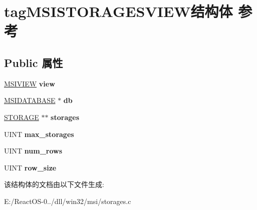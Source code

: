 \hypertarget{structtag_m_s_i_s_t_o_r_a_g_e_s_v_i_e_w}{}\section{tag\+M\+S\+I\+S\+T\+O\+R\+A\+G\+E\+S\+V\+I\+E\+W结构体 参考}
\label{structtag_m_s_i_s_t_o_r_a_g_e_s_v_i_e_w}
\subsection*{Public 属性}
\begin{DoxyCompactItemize}
\item 
\mbox{\label{structtag_m_s_i_s_t_o_r_a_g_e_s_v_i_e_w_a918a3b28d1acaf81cf32392324a6652d}} 
\hyperlink{structtag_m_s_i_v_i_e_w}{M\+S\+I\+V\+I\+EW} {\bfseries view}
\item 
\mbox{\label{structtag_m_s_i_s_t_o_r_a_g_e_s_v_i_e_w_ab618572dcfac6aac2fda5800db3171e3}} 
\hyperlink{structtag_m_s_i_d_a_t_a_b_a_s_e}{M\+S\+I\+D\+A\+T\+A\+B\+A\+SE} $\ast$ {\bfseries db}
\item 
\mbox{\label{structtag_m_s_i_s_t_o_r_a_g_e_s_v_i_e_w_ab9f5aff467745018e46313ce2a0b24fb}} 
\hyperlink{structtab_s_t_o_r_a_g_e}{S\+T\+O\+R\+A\+GE} $\ast$$\ast$ {\bfseries storages}
\item 
\mbox{\label{structtag_m_s_i_s_t_o_r_a_g_e_s_v_i_e_w_a4d7735307ba2166faa7dac33fe72e484}} 
U\+I\+NT {\bfseries max\+\_\+storages}
\item 
\mbox{\label{structtag_m_s_i_s_t_o_r_a_g_e_s_v_i_e_w_a7953d8d2962ce2dede4e168dbc34a77a}} 
U\+I\+NT {\bfseries num\+\_\+rows}
\item 
\mbox{\label{structtag_m_s_i_s_t_o_r_a_g_e_s_v_i_e_w_a6dc2274a06841ab07da5a61e8867abcf}} 
U\+I\+NT {\bfseries row\+\_\+size}
\end{DoxyCompactItemize}


该结构体的文档由以下文件生成\+:\begin{DoxyCompactItemize}
\item 
E\+:/\+React\+O\+S-\/0../dll/win32/msi/storages.\+c\end{DoxyCompactItemize}
